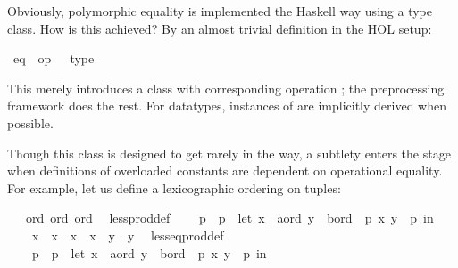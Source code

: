 \begin{isabellebody}
\begin{isamarkuptext}
Obviously, polymorphic equality is implemented the Haskell
  way using a type class.  How is this achieved?  By an
  almost trivial definition in the HOL setup:%
\end{isamarkuptext}%
\isamarkuptrue%
%
\isadelimML
%
\endisadelimML
%
\isatagML
%
\endisatagML
{\isafoldML}%
%
\isadelimML
%
\endisadelimML
{}\isamarkupfalse%
\ eq\ {\isacharparenleft}\ {\isachardoublequoteopen}op\ {\isacharequal}{\isachardoublequoteclose}{\isacharparenright}\ {\isacharequal}\ type%
\begin{isamarkuptext}%
This merely introduces a class  with corresponding
  operation ;
  the preprocessing framework does the rest.
  For datatypes, instances of  are implicitly derived
  when possible.

  Though this  class is designed to get rarely in
  the way, a subtlety
  enters the stage when definitions of overloaded constants
  are dependent on operational equality.  For example, let
  us define a lexicographic ordering on tuples:%
\end{isamarkuptext}%
\isamarkuptrue%
%
\isadelimML
%
\endisadelimML
%
\isatagML
%
\endisatagML
{\isafoldML}%
%
\isadelimML
%
\endisadelimML
{}\isamarkupfalse%
\ {\isacharasterisk}\ {\isacharcolon}{\isacharcolon}\ {\isacharparenleft}ord{\isacharcomma}\ ord{\isacharparenright}\ ord\isanewline
\ \ less{\isacharunderscore}prod{\isacharunderscore}def{\isacharcolon}\isanewline
\ \ \ \ {\isachardoublequoteopen}p{}\ {\isacharless}\ p{}\ {\isasymequiv}\ let\ {\isacharparenleft}x{}\ {\isasymColon}\ {\isacharprime}a{\isasymColon}ord{\isacharcomma}\ y{}\ {\isasymColon}\ {\isacharprime}b{\isasymColon}ord{\isacharparenright}\ {\isacharequal}\ p{}{\isacharsemicolon}\ {\isacharparenleft}x{}{\isacharcomma}\ y{}{\isacharparenright}\ {\isacharequal}\ p{}\ in\isanewline
\ \ \ \ x{}\ {\isacharless}\ x{}\ {\isasymor}\ {\isacharparenleft}x{}\ {\isacharequal}\ x{}\ {\isasymand}\ y{}\ {\isacharless}\ y{}{\isacharparenright}{\isachardoublequoteclose}\isanewline
\ \ less{\isacharunderscore}eq{\isacharunderscore}prod{\isacharunderscore}def{\isacharcolon}\isanewline
\ \ \ \ {\isachardoublequoteopen}p{}\ {\isasymle}\ p{}\ {\isasymequiv}\ let\ {\isacharparenleft}x{}\ {\isasymColon}\ {\isacharprime}a{\isasymColon}ord{\isacharcomma}\ y{}\ {\isasymColon}\ {\isacharprime}b{\isasymColon}ord{\isacharparenright}\ {\isacharequal}\ p{}{\isacharsemicolon}\ {\isacharparenleft}x{}{\isacharcomma}\ y{}{\isacharparenright}\ {\isacharequal}\ p{}\ in\isanewline

\end{isabellebody}

